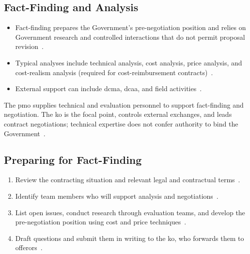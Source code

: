 \documentclass[../main.tex]{subfiles}
\begin{document}
\subsection{Fact-Finding and Analysis}
\begin{itemize}
  \item Fact-finding prepares the Government's pre-negotiation position and relies on Government research and controlled interactions that do not permit proposal revision~\autocite{edo-3-2-3-source-selection-2025}.
  \item Typical analyses include technical analysis, cost analysis, price analysis, and cost-realism analysis (required for cost-reimbursement contracts)~\autocite{edo-3-2-3-source-selection-2025,FAR-15-305-Proposal-Evaluation}.
  \item External support can include \ac{dcma}, \ac{dcaa}, and field activities~\autocite{edo-3-2-3-source-selection-2025,FAR-15-305-Proposal-Evaluation,DCMA-About-2026,DCAA-About-2026}.
\end{itemize}

The \ac{pmo} supplies technical and evaluation personnel to support fact-finding and negotiation. The \ac{ko} is the focal point, controls external exchanges, and leads contract negotiations; technical expertise does not confer authority to bind the Government~\autocite{edo-3-2-3-source-selection-2025,FAR-Overhaul-Part15-2026}.

\subsection{Preparing for Fact-Finding}
\begin{enumerate}
  \item Review the contracting situation and relevant legal and contractual terms~\autocite{edo-3-2-3-source-selection-2025}.
  \item Identify team members who will support analysis and negotiations~\autocite{edo-3-2-3-source-selection-2025}.
  \item List open issues, conduct research through evaluation teams, and develop the pre-negotiation position using cost and price techniques~\autocite{edo-3-2-3-source-selection-2025}.
  \item Draft questions and submit them in writing to the \ac{ko}, who forwards them to offerors~\autocite{edo-3-2-3-source-selection-2025}.
\end{enumerate}
\end{document}
